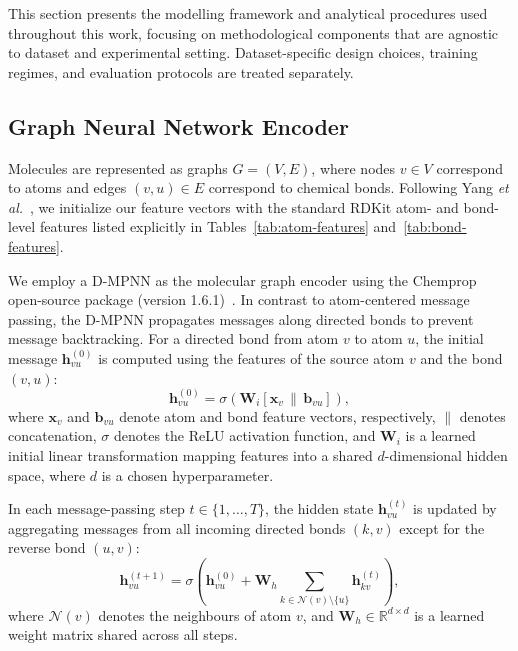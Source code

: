 This section presents the modelling framework and analytical procedures used throughout this work, focusing on methodological components that are agnostic to dataset and experimental setting. Dataset-specific design choices, training regimes, and evaluation protocols are treated separately.

\subsection{Graph Neural Network Encoder}

Molecules are represented as graphs $G = (V, E)$, where nodes $v \in V$ correspond to atoms and edges $(v,u) \in E$ correspond to chemical bonds. Following Yang \textit{et al.}~\cite{yang2019analyzing}, we initialize our feature vectors with the standard RDKit atom- and bond-level features listed explicitly in Tables~\ref{tab:atom-features} and~\ref{tab:bond-features}. 

We employ a D-MPNN as the molecular graph encoder using the Chemprop open-source package (version 1.6.1)~\cite{yang2019analyzing}. In contrast to atom-centered message passing, the D-MPNN propagates messages along directed bonds to prevent message backtracking. For a directed bond from atom $v$ to atom $u$, the initial message $\mathbf{h}_{vu}^{(0)}$ is computed using the features of the source atom $v$ and the bond $(v,u)$:
\begin{equation}
\mathbf{h}_{vu}^{(0)} = \sigma(\mathbf{W}_i [\mathbf{x}_v \,\|\, \mathbf{b}_{vu}]),
\end{equation}
where $\mathbf{x}_v$ and $\mathbf{b}_{vu}$ denote atom and bond feature vectors, respectively, $\|$ denotes concatenation, $\sigma$ denotes the ReLU activation function, and $\mathbf{W}_i$ is a learned initial linear transformation mapping features into a shared $d$-dimensional hidden space, where $d$ is a chosen hyperparameter.


In each message-passing step $t \in \{1, \dots, T\}$, the hidden state $\mathbf{h}_{vu}^{(t)}$ is updated by aggregating messages from all incoming directed bonds $(k,v)$ except for the reverse bond $(u,v)$:
\begin{equation}
\mathbf{h}_{vu}^{(t+1)} = \sigma \!\left(
\mathbf{h}_{vu}^{(0)} + \mathbf{W}_h
\sum_{k \in \mathcal{N}(v) \setminus \{u\}} \mathbf{h}_{kv}^{(t)}
\right),
\end{equation}
where $\mathcal{N}(v)$ denotes the neighbours of atom $v$, and $\mathbf{W}_h \in \mathbb{R}^{d \times d}$ is a learned weight matrix shared across all steps.


